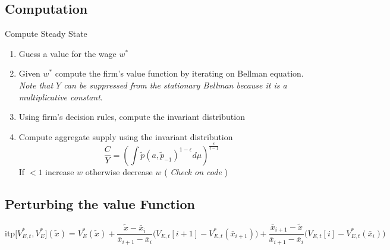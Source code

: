 \documentclass[a4paper,10pt]{article}  %
\begin{document}
\subsection{Computation} %
\label{sub:computation}

Compute Steady State
\begin{enumerate}
   
   \item Guess a value for the wage $ w^* $
   \item Given $ w^* $ compute the firm's value function by iterating on Bellman equation. 
   \emph{Note that $ Y $ can be suppressed from the stationary Bellman because it is a multiplicative
      constant}. 
   \item Using firm's decision rules, compute the invariant distribution
   \item Compute aggregate supply using the invariant distribution 
   \[
      \frac{C}{Y} = \left( \int  \tilde{p}(a,\tilde{p}_{-1})^{1 -\epsilon} d\mu \right)^{ \frac{\epsilon}{\epsilon-1} }
   \]
   If $ <1 $ increase $ w $ otherwise decrease $ w $ ( {\em \color{blue} Check on code} )
\end{enumerate}



\subsection{Perturbing the value Function} %
\label{sub:perturbing_the_value_function}

\begin{equation}
   \label{eq:interpol}
   \text{itp} \Big[ V_{E,t}^*, V_{E}^{*} \Big]( \tilde{x} ) = V_{E}^*( \tilde{x} ) + 
      \frac{ \tilde{x} - \bar{x}_i }{ \bar{x}_{i+1} - \bar{x}_i } \Big( V_{E,t}[i+1] - V_{E,t}^{*}(\bar{x}_{i+1}) \Big) +
      \frac{ \bar{x}_{i+1} -\tilde{x} }{ \bar{x}_{i+1} - \bar{x}_i } \Big( V_{E,t}[i] - V_{E,t}^{*}(\bar{x}_i) \Big)
\end{equation}
\end{document}
